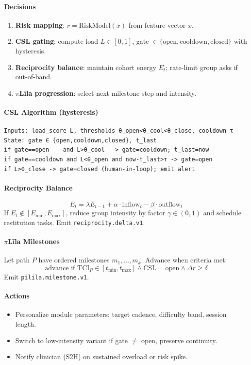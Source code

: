 \documentclass[11pt]{article}
\theoremstyle{plain}
\begin{document}
\paragraph{Decisions}
\begin{enumerate}
  \item \textbf{Risk mapping}: $r=\mathrm{RiskModel}(x)$ from feature vector $x$.
  \item \textbf{CSL gating}: compute load $L \in [0,1]$, gate $\in \{\mathrm{open},\mathrm{cooldown},\mathrm{closed}\}$ with hysteresis.
  \item \textbf{Reciprocity balance}: maintain cohort energy $E_t$; rate-limit group asks if out-of-band.
  \item \textbf{$\pi$Līla progression}: select next milestone step and intensity.
\end{enumerate}

\paragraph{CSL Algorithm (hysteresis)}
\begin{verbatim}
Inputs: load_score L, thresholds θ_open<θ_cool<θ_close, cooldown τ
State: gate ∈ {open,cooldown,closed}, t_last
if gate==open    and L>θ_cool  -> gate=cooldown; t_last=now
if gate==cooldown and L<θ_open and now-t_last>τ -> gate=open
if L>θ_close -> gate=closed (human-in-loop); emit alert
\end{verbatim}

\paragraph{Reciprocity Balance}
\[
E_t = \lambda E_{t-1} + \alpha \cdot \text{inflow}_t - \beta \cdot \text{outflow}_t
\]
If $E_t \notin [E_{\min},E_{\max}]$, reduce group intensity by factor $\gamma \in (0,1)$ and schedule restitution tasks. Emit \texttt{reciprocity.delta.v1}.

\paragraph{$\pi$Līla Milestones}
Let path $P$ have ordered milestones $m_1,\dots,m_k$. Advance when criteria met:
\[
\text{advance if } \text{TCI}_P \in [t_{\min}, t_{\max}] \wedge \text{CSL}=\mathrm{open} \wedge \Delta r \ge \delta
\]
Emit \texttt{pilila.milestone.v1}.

\paragraph{Actions}
\begin{itemize}
  \item Personalize module parameters: target cadence, difficulty band, session length.
  \item Switch to low-intensity variant if gate $\ne$ open, preserve continuity.
  \item Notify clinician (S2H) on sustained overload or risk spike.
\end{itemize}
\end{document}
